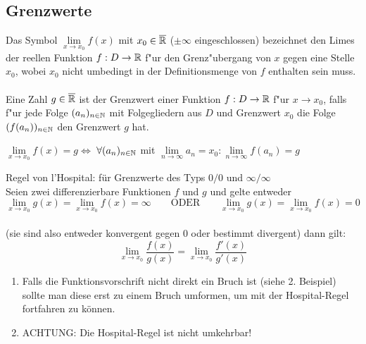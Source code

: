 \documentclass[main.tex]{subfiles}
\begin{document}
\subsection{Grenzwerte}

\begin{Definition}
Das Symbol $\lim\limits_{x \rightarrow x_{0}}f(x)$ mit $x_{0} \in \overline{\mathbb{R}}$ ($\pm \infty$ eingeschlossen) bezeichnet den Limes der reellen Funktion $f:D\rightarrow \mathbb{R}$ f"ur den Grenz"ubergang von $x$ gegen eine Stelle $x_{0}$, wobei $x_{0}$ nicht umbedingt in der Definitionsmenge von $f$ enthalten sein muss.\\
\\
Eine Zahl $g \in \overline{\mathbb{R}}$ ist der Grenzwert einer Funktion $f:D\rightarrow \mathbb{R}$ f"ur $x\rightarrow x_{0}$, falls f"ur jede Folge $(a_{n})_{n\in \mathbb{N}}$ mit Folgegliedern aus $D$ und Grenzwert $x_{0}$ die Folge $(f(a_{n}))_{n\in \mathbb{N}}$ den Grenzwert $g$ hat.
\begin{center}
$\lim\limits_{x \rightarrow x_{0}}f(x) = g $\quad $\Leftrightarrow$ \quad $\forall (a_{n})_{n\in \mathbb{N}}$ mit $\lim\limits_{n \rightarrow \infty}a_{n}=x_{0} : \lim\limits_{n \rightarrow \infty}f(a_{n})=g$
\end{center}
\end{Definition}

\begin{Theorem}
	Regel von l'Hospital: für Grenzwerte des Typs $0/0$ und $\infty/\infty$\\
	Seien zwei differenzierbare Funktionen $f$ und $g$ und gelte entweder\\
	$$\lim\limits_{x \rightarrow x_{0}}g(x) = \lim\limits_{x \rightarrow x_{0}}f(x) = \infty \qquad \text{ODER} \qquad  \lim\limits_{x \rightarrow x_{0}}g(x) = \lim\limits_{x \rightarrow x_{0}}f(x) = 0$$\\
	(sie sind also entweder konvergent gegen $0$ oder bestimmt divergent) dann gilt:\\
	$$\lim\limits_{x \rightarrow x_{0}} \dfrac{f(x)}{g(x)} = \lim\limits_{x \rightarrow x_{0}}\dfrac{f'(x)}{g'(x)}$$
\end{Theorem}

\begin{Bemerkung}
	\begin{enumerate}
		\item Falls die Funktionsvorschrift nicht direkt ein Bruch ist (siehe 2. Beispiel) sollte man diese erst zu einem Bruch umformen, um mit der Hospital-Regel fortfahren zu können.
		\item ACHTUNG: Die Hospital-Regel ist nicht umkehrbar!
	\end{enumerate}
\end{Bemerkung}
\end{document}
